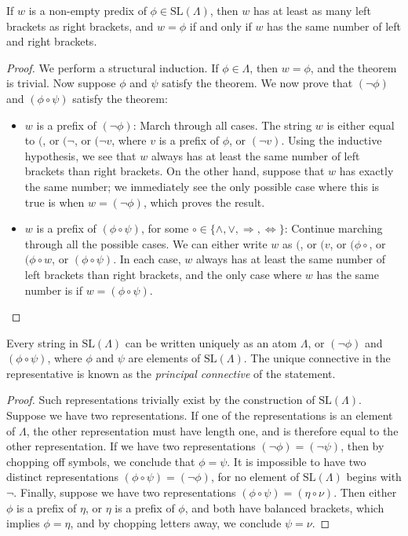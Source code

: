 \begin{theorem}
    If $w$ is a non-empty predix of $\phi \in \text{SL}(\Lambda)$, then $w$ has at least as many left brackets as right brackets, and $w = \phi$ if and only if $w$ has the same number of left and right brackets.
\end{theorem}
\begin{proof}
    We perform a structural induction. If $\phi \in \Lambda$, then $w = \phi$, and the theorem is trivial. Now suppose $\phi$ and $\psi$ satisfy the theorem. We now prove that $(\neg \phi)$ and $(\phi \circ \psi)$ satisfy the theorem:
    \begin{itemize}
        \item $w$ is a prefix of $(\neg \phi)$: March through all cases. The string $w$ is either equal to $($, or $(\neg$, or $(\neg v$, where $v$ is a prefix of $\phi$, or $(\neg v)$. Using the inductive hypothesis, we see that $w$ always has at least the same number of left brackets than right brackets. On the other hand, suppose that $w$ has exactly the same number; we immediately see the only possible case where this is true is when $w = (\neg \phi)$, which proves the result.

        \item $w$ is a prefix of $(\phi \circ \psi)$, for some $\circ \in \{ \wedge, \vee, \Rightarrow, \Leftrightarrow \}$: Continue marching through all the possible cases. We can either write $w$ as $($, or $(v$, or $(\phi \circ$, or $(\phi \circ w$, or $(\phi \circ \psi)$. In each case, $w$ always has at least the same number of left brackets than right brackets, and the only case where $w$ has the same number is if $w = (\phi \circ \psi)$. \qedhere
    \end{itemize}
\end{proof}

\begin{corollary}
    Every string in $\text{SL}(\Lambda)$ can be written uniquely as an atom $\Lambda$, or $(\neg \phi)$ and $(\phi \circ \psi)$, where $\phi$ and $\psi$ are elements of $\text{SL}(\Lambda)$. The unique connective in the representative is known as the \emph{principal connective} of the statement.
\end{corollary}
\begin{proof}
    Such representations trivially exist by the construction of $\text{SL}(\Lambda)$. Suppose we have two representations. If one of the representations is an element of $\Lambda$, the other representation must have length one, and is therefore equal to the other representation. If we have two representations $(\neg \phi) = (\neg \psi)$, then by chopping off symbols, we conclude that $\phi = \psi$. It is impossible to have two distinct representations $(\phi \circ \psi) = (\neg \phi)$, for no element of $\text{SL}(\Lambda)$ begins with $\neg$. Finally, suppose we have two representations $(\phi \circ \psi) = (\eta \circ \nu)$. Then either $\phi$ is a prefix of $\eta$, or $\eta$ is a prefix of $\phi$, and both have balanced brackets, which implies $\phi = \eta$, and by chopping letters away, we conclude $\psi = \nu$.
\end{proof}

